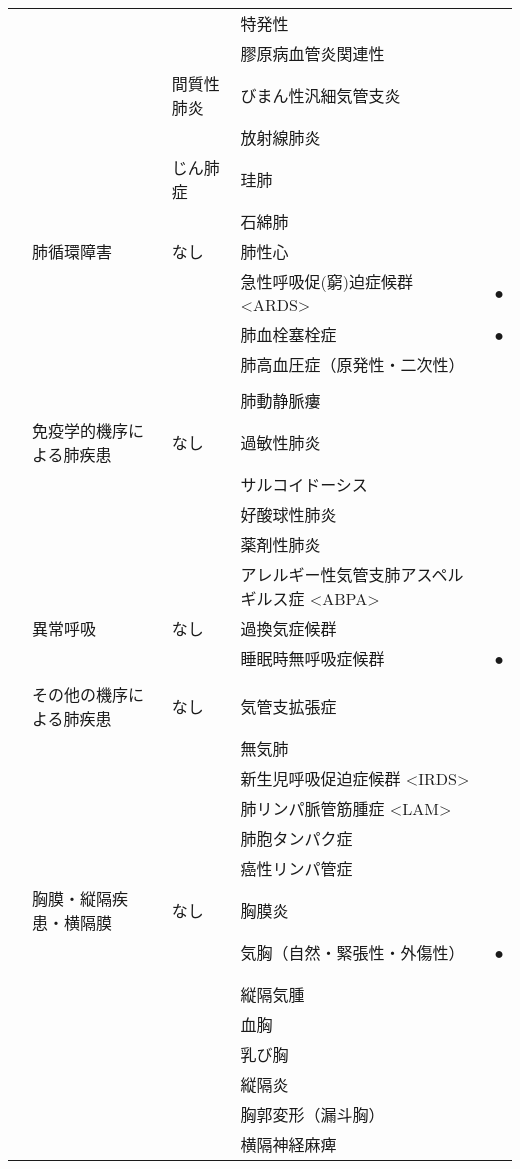 \begin{xltabular}{\linewidth}{XXXXX}
 &  &  & 特発性 &  \\
 &  &  & 膠原病血管炎関連性 &  \\
 &  & 間質性肺炎 & びまん性汎細気管支炎 &  \\
 &  &  & 放射線肺炎 &  \\
 &  & じん肺症 & 珪肺 &  \\
 &  &  & 石綿肺 &  \\
 & 肺循環障害 & なし & 肺性心 &  \\
 &  &  & 急性呼吸促(窮)迫症候群 <ARDS> & ● \\
 &  &  & 肺血栓塞栓症 & ● \\
 &  &  & 肺高血圧症（原発性・二次性） &  \\
 &  &  &  &  \\
 &  &  & 肺動静脈瘻 &  \\
 & 免疫学的機序による肺疾患 & なし & 過敏性肺炎 &  \\
 &  &  & サルコイドーシス &  \\
 &  &  & 好酸球性肺炎 &  \\
 &  &  & 薬剤性肺炎 &  \\
 &  &  & アレルギー性気管支肺アスペルギルス症 <ABPA> &  \\
 & 異常呼吸 & なし & 過換気症候群 &  \\
 &  &  & 睡眠時無呼吸症候群 & ● \\
 &  &  &  &  \\
 & その他の機序による肺疾患 & なし & 気管支拡張症 &  \\
 &  &  & 無気肺 &  \\
 &  &  & 新生児呼吸促迫症候群 <IRDS> &  \\
 &  &  & 肺リンパ脈管筋腫症 <LAM> &  \\
 &  &  & 肺胞タンパク症 &  \\
 &  &  & 癌性リンパ管症 &  \\
 & 胸膜・縦隔疾患・横隔膜 & なし & 胸膜炎 &  \\
 &  &  & 気胸（自然・緊張性・外傷性） & ● \\
 &  &  &  &  \\
 &  &  &  &  \\
 &  &  & 縦隔気腫 &  \\
 &  &  & 血胸 &  \\
 &  &  & 乳び胸 &  \\
 &  &  & 縦隔炎 &  \\
 &  &  & 胸郭変形（漏斗胸） &  \\
 &  &  & 横隔神経麻痺 &  \\

\end{xltabular}
